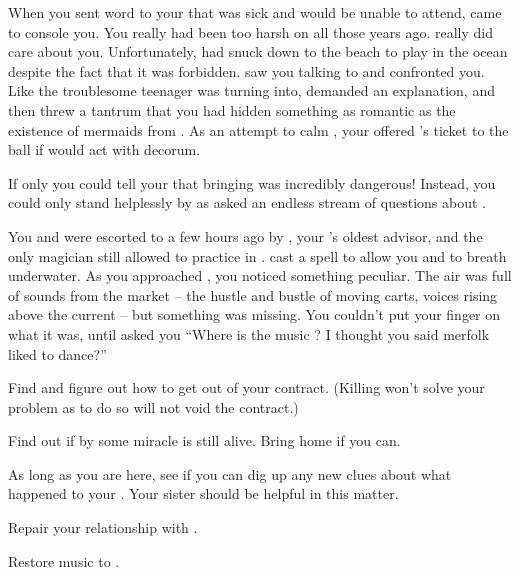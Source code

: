 \documentclass[char]{NeptuneBall}
\begin{document}
When you sent word to your \cKing{\parent} that \cEric{} was sick and would be unable to attend, \cKing{} came to console you. You really had been too harsh on \cKing{\them} all those years ago. \cKing{} really did care about you. Unfortunately, \cWillow{} had snuck down to the beach to play in the ocean despite the fact that it was forbidden. \cWillow{\They} saw you talking to \cKing{} and confronted you. Like the troublesome teenager \cWillow{\they} was turning into, \cWillow{} demanded an explanation, and then threw a tantrum that you had hidden something as romantic as the existence of mermaids from \cWillow{\them}. As an attempt to calm \cWillow{}, your \cKing{\parent} offered \cWillow{\them} \cEric{}'s ticket to the ball if \cWillow{\they} would act with decorum.

If only you could tell your \cKing{\parent} that bringing \cWillow{} was incredibly dangerous! Instead, you could only stand helplessly by as \cWillow{} asked an endless stream of questions about \pAtlantis{}.

You and \cWillow{} were escorted to \pAtlantis{} a few hours ago by \cManta{}, your \cKing{\parent}'s oldest advisor, and the only magician still allowed to practice in \pAtlantis{}. \cManta{} cast a spell to allow you and \cWillow{} to breath underwater. As you approached \pAtlantis{}, you noticed something peculiar. The air was full of sounds from the market -- the hustle and bustle of moving carts, voices rising above the current -- but something was missing. You couldn't put your finger on what it was, until \cWillow{} asked you ``Where is the music \cAriel{\parent}? I thought you said merfolk liked to dance?''

\begin{itemz}[Goals]
  \item Find \cWitch{} and figure out how to get out of your contract. (Killing \cWitch{} won't solve your problem as to do so will not void the contract.)
  \item Find out if by some miracle \cSlave{} is still alive. Bring \cSlave{\them} home if you can.
  \item As long as you are here, see if you can dig up any new  clues about what happened to your \cAthena{\parent}. Your sister should be helpful in this matter.
  \item Repair your relationship with \cKing{\King} \cKing{}.
  \item Restore music to \pAtlantis{}.
\end{itemz}
\end{document}

